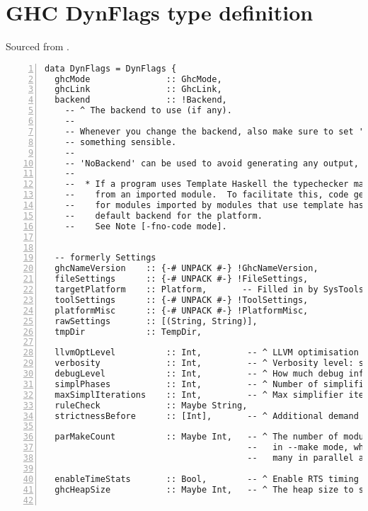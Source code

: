 \documentclass[en]{pracamgr}
\begin{document}
\chapter{GHC DynFlags type definition}\label{appendix:typedef}
Sourced from \cite{GHCDynFlagsDefinition}.
\begin{lstlisting}[numbers=left,stepnumber=1]
data DynFlags = DynFlags {
  ghcMode               :: GhcMode,
  ghcLink               :: GhcLink,
  backend               :: !Backend,
    -- ^ The backend to use (if any).
    --
    -- Whenever you change the backend, also make sure to set 'ghcLink' to
    -- something sensible.
    --
    -- 'NoBackend' can be used to avoid generating any output, however, note that:
    --
    --  * If a program uses Template Haskell the typechecker may need to run code
    --    from an imported module.  To facilitate this, code generation is enabled
    --    for modules imported by modules that use template haskell, using the
    --    default backend for the platform.
    --    See Note [-fno-code mode].


  -- formerly Settings
  ghcNameVersion    :: {-# UNPACK #-} !GhcNameVersion,
  fileSettings      :: {-# UNPACK #-} !FileSettings,
  targetPlatform    :: Platform,       -- Filled in by SysTools
  toolSettings      :: {-# UNPACK #-} !ToolSettings,
  platformMisc      :: {-# UNPACK #-} !PlatformMisc,
  rawSettings       :: [(String, String)],
  tmpDir            :: TempDir,

  llvmOptLevel          :: Int,         -- ^ LLVM optimisation level
  verbosity             :: Int,         -- ^ Verbosity level: see Note [Verbosity levels]
  debugLevel            :: Int,         -- ^ How much debug information to produce
  simplPhases           :: Int,         -- ^ Number of simplifier phases
  maxSimplIterations    :: Int,         -- ^ Max simplifier iterations
  ruleCheck             :: Maybe String,
  strictnessBefore      :: [Int],       -- ^ Additional demand analysis

  parMakeCount          :: Maybe Int,   -- ^ The number of modules to compile in parallel
                                        --   in --make mode, where Nothing ==> compile as
                                        --   many in parallel as there are CPUs.

  enableTimeStats       :: Bool,        -- ^ Enable RTS timing statistics?
  ghcHeapSize           :: Maybe Int,   -- ^ The heap size to set.


\end{lstlisting}
\end{document}
